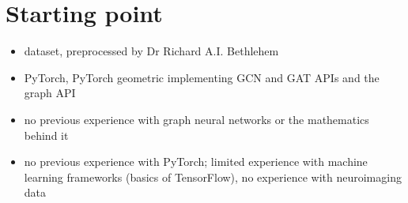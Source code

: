 \section{Starting point}
\begin{itemize}
    \item dataset, preprocessed by Dr Richard A.I. Bethlehem
    \item PyTorch, PyTorch geometric implementing GCN and GAT APIs and the graph API
    \item no previous experience with graph neural networks or the mathematics behind it
    \item no previous experience with PyTorch; limited experience with machine learning frameworks (basics of TensorFlow), no experience with neuroimaging data
\end{itemize}
